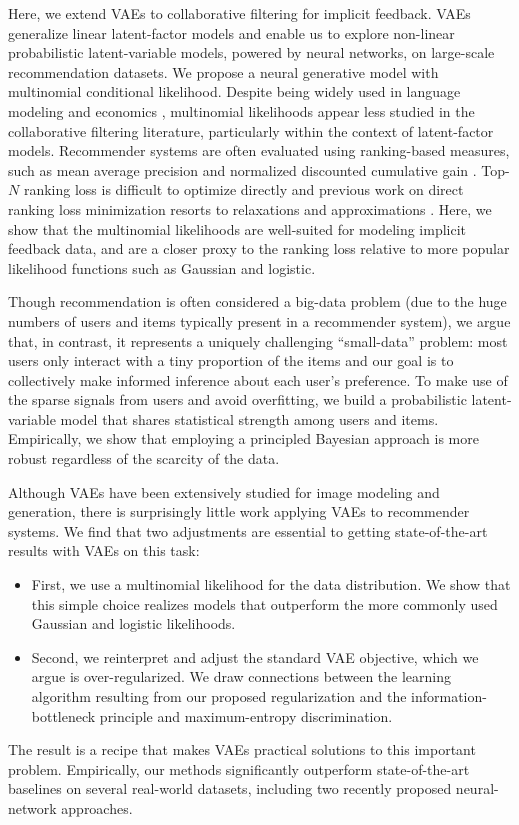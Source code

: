 \documentclass[sigconf]{acmart}
\begin{document}
Here, we extend \glspl{VAE} \citep{kingma2013auto,rezende2014stochastic}
to collaborative filtering for implicit feedback. \Glspl{VAE} generalize linear latent-factor models and enable us to
explore non-linear probabilistic latent-variable models, powered by neural networks, on large-scale recommendation datasets. 
We propose a neural generative model with multinomial conditional likelihood. Despite being widely used in language
modeling and economics \citep{blei2003latent,mcfadden1973conditional}, multinomial likelihoods appear
less studied in the collaborative filtering literature, particularly within the context of latent-factor models.
Recommender systems are often evaluated using ranking-based measures, such as mean 
average precision and normalized discounted cumulative gain \citep{jarvelin2002cumulated}. 
Top-$N$ ranking loss is difficult to optimize directly and previous work on direct ranking 
loss minimization resorts to relaxations and approximations \citep{weimer2008cofi,weston2011wsabie}.  
Here, we show that the multinomial likelihoods are well-suited for modeling implicit feedback data, and are a closer proxy to the ranking 
loss relative to more popular likelihood functions such as Gaussian and logistic. 

Though recommendation is often considered a big-data problem (due to the huge numbers of users
and items typically present in a recommender system), we argue that, in contrast, it represents a uniquely 
challenging ``small-data'' problem: most users only interact with a tiny proportion of the items 
and our goal is to collectively make informed inference about each user's preference. To make use of the sparse 
signals from users and avoid overfitting, we build a probabilistic latent-variable model that shares 
statistical strength among users and items. Empirically, we show that employing a 
principled Bayesian approach is more robust regardless of the scarcity of the data.

Although \glspl{VAE} have been extensively studied for image modeling and generation,
there is surprisingly little work applying \glspl{VAE} to recommender systems.
We find that two adjustments are essential to getting state-of-the-art results with \glspl{VAE} on this task:
\begin{itemize}
\item First, we use a multinomial likelihood for the data distribution. We show that this simple choice
realizes models that outperform the more commonly used Gaussian and logistic likelihoods.
\item Second, we reinterpret and adjust the standard \gls{VAE} objective, which we argue is over-regularized.
We draw connections between the learning algorithm resulting from our proposed regularization 
and the information-bottleneck principle and maximum-entropy discrimination. 
\end{itemize}
The result is a recipe that makes \glspl{VAE} practical solutions to this important problem.
Empirically, our methods significantly outperform 
state-of-the-art baselines on several real-world datasets, including
two recently proposed neural-network approaches.
 
\end{document}
